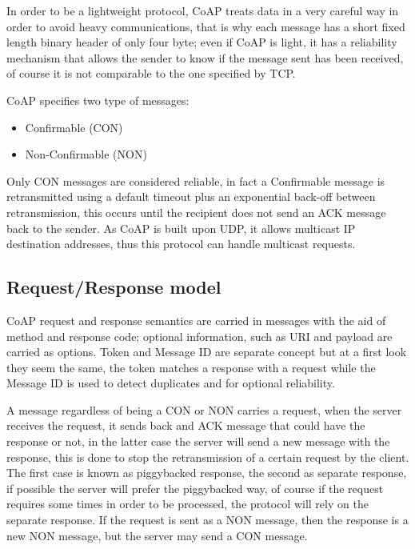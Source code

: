 	In order to be a lightweight protocol, CoAP treats data in a very careful way in order to avoid heavy communications, that is why each message has a short fixed length binary header of only four byte; even if CoAP is light, it has a reliability mechanism that allows the sender to know if the message sent has been received, of course it is not comparable to the one specified by TCP.\newline
	
	CoAP specifies two type of messages:
	\begin{itemize}
		\item Confirmable (CON)
		\item Non-Confirmable (NON)
	\end{itemize}
	Only CON messages are considered reliable, in fact a Confirmable message is retransmitted using a default timeout plus an exponential back-off between retransmission, this occurs until the recipient does not send an ACK message back to the sender.\newline
	As CoAP is built upon UDP, it allows multicast IP destination addresses, thus this protocol can handle multicast requests.\newline
	
	\subsection{Request/Response model}
	CoAP request and response semantics are carried in messages with the aid of method and response code; optional information, such as URI and payload are carried as options.\newline
	Token and Message ID are separate concept but at a first look they seem the same, the token matches a response
	with a request while the Message ID is used to detect duplicates and for optional reliability.\newline
	
	A message regardless of being a CON or NON carries a request, when the server receives the request, it sends back and ACK message that could have the response or not, in the latter case the server will
	send a new message with the response, this is done to stop the retransmission of a certain request by the client.\newline
	The first case is known as piggybacked response, the second as separate response, if possible the server will prefer the piggybacked way, of course if the request requires some times in order to be processed, the protocol will rely on the separate response.\newline
	If the request is sent as a NON message, then the response is a new NON message, but the server may send a CON message.\newline
	
